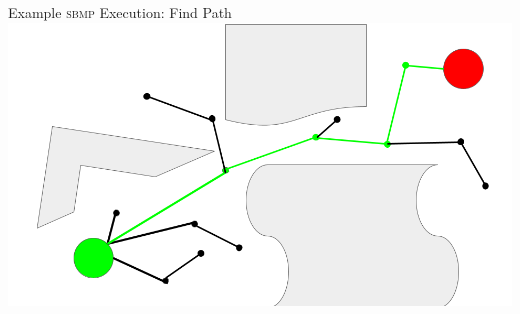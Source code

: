 \documentclass{beamer}
\begin{document}
\begin{frame}{Example \textsc{sbmp} Execution: Find Path}
\includegraphics[width=\textwidth]{./assets/rrt_slides/rrt_slides_8.png}
\end{frame}
\end{document}
